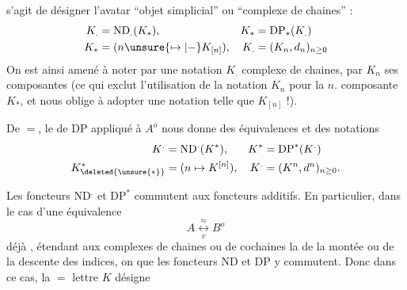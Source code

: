 s'agit de désigner l'avatar ``objet simplicial'' ou ``complexe de chaines'' :
\[
 \begin{aligned}
 K_.&=\mathrm{ND}_ .(K_*), &K_*&=\mathrm{DP}_*(K_.)\\
 K_*&=(n\unsure{\mapsto|-}K_{[n]}), &K_.&=(K_n,d_n)_{n\geq0}
 \end{aligned}
\]
On est ainsi amené à noter par une notation $K_.$  complexe de chaines, par $K_n$ ses composantes (ce qui exclut l'utilisation de la notation $K_n$ pour la $n$. composante  $K_*$, et nous oblige à adopter une notation telle que $K_{[n]}$ !).

De $=$, le  de DP appliqué à $A^o$ nous donne des équivalences
et des notations
\[
 \begin{aligned}
 K^{.}&=\mathrm{ND}^{.}(K^*), & K^*&=\mathrm{DP}^*(K^{.})\\
 K_{\deleted{\unsure{*}}}^{*}&=(n\mapsto K^{[n]}), &K^{.}&=(K^n,d^n)_{n\geq0}.
 \end{aligned}
\]

Les foncteurs $\mathrm{ND}^{.}$ et $\mathrm{DP}^*$ commutent aux foncteurs additifs. En particulier, dans le cas d'une équivalence
\[
 A\underset{v}{\overset{\approx}{\longleftrightarrow}}B^o
\]
déjà , étendant aux complexes de chaines ou de cochaines la  de la montée ou de la descente des indices, on  que les foncteurs ND et DP y commutent. Donc dans ce cas, la $=$ lettre $K$ désigne
